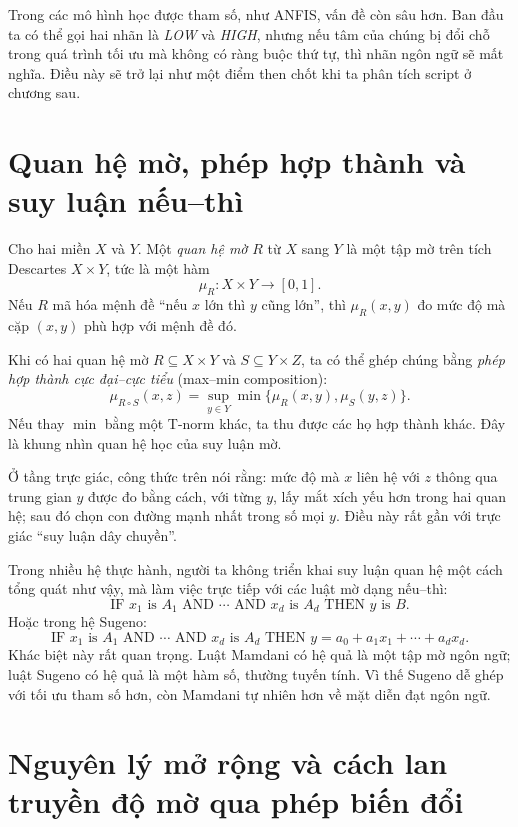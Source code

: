Trong các mô hình học được tham số, như ANFIS, vấn đề còn sâu hơn. Ban đầu ta có thể gọi hai nhãn là \emph{LOW} và \emph{HIGH}, nhưng nếu tâm của chúng bị đổi chỗ trong quá trình tối ưu mà không có ràng buộc thứ tự, thì nhãn ngôn ngữ sẽ mất nghĩa. Điều này sẽ trở lại như một điểm then chốt khi ta phân tích script ở chương sau.

\section{Quan hệ mờ, phép hợp thành và suy luận nếu--thì}

Cho hai miền \(X\) và \(Y\). Một \emph{quan hệ mờ} \(R\) từ \(X\) sang \(Y\) là một tập mờ trên tích Descartes \(X\times Y\), tức là một hàm
\[
\mu_R:X\times Y\to[0,1].
\]
Nếu \(R\) mã hóa mệnh đề ``nếu \(x\) lớn thì \(y\) cũng lớn'', thì \(\mu_R(x,y)\) đo mức độ mà cặp \((x,y)\) phù hợp với mệnh đề đó.

Khi có hai quan hệ mờ \(R\subseteq X\times Y\) và \(S\subseteq Y\times Z\), ta có thể ghép chúng bằng \emph{phép hợp thành cực đại--cực tiểu} (max--min composition):
\[
\mu_{R\circ S}(x,z)=\sup_{y\in Y}\min\{\mu_R(x,y),\mu_S(y,z)\}.
\]
Nếu thay \(\min\) bằng một T-norm khác, ta thu được các họ hợp thành khác. Đây là khung nhìn quan hệ học của suy luận mờ.

Ở tầng trực giác, công thức trên nói rằng: mức độ mà \(x\) liên hệ với \(z\) thông qua trung gian \(y\) được đo bằng cách, với từng \(y\), lấy mắt xích yếu hơn trong hai quan hệ; sau đó chọn con đường mạnh nhất trong số mọi \(y\). Điều này rất gần với trực giác ``suy luận dây chuyền''.

Trong nhiều hệ thực hành, người ta không triển khai suy luận quan hệ một cách tổng quát như vậy, mà làm việc trực tiếp với các luật mờ dạng nếu--thì:
\[
\text{IF } x_1 \text{ is } A_1 \text{ AND } \cdots \text{ AND } x_d \text{ is } A_d
\text{ THEN } y \text{ is } B.
\]
Hoặc trong hệ Sugeno:
\[
\text{IF } x_1 \text{ is } A_1 \text{ AND } \cdots \text{ AND } x_d \text{ is } A_d
\text{ THEN } y = a_0 + a_1x_1+\cdots + a_dx_d.
\]
Khác biệt này rất quan trọng. Luật Mamdani có hệ quả là một tập mờ ngôn ngữ; luật Sugeno có hệ quả là một hàm số, thường tuyến tính. Vì thế Sugeno dễ ghép với tối ưu tham số hơn, còn Mamdani tự nhiên hơn về mặt diễn đạt ngôn ngữ.

\section{Nguyên lý mở rộng và cách lan truyền độ mờ qua phép biến đổi}

